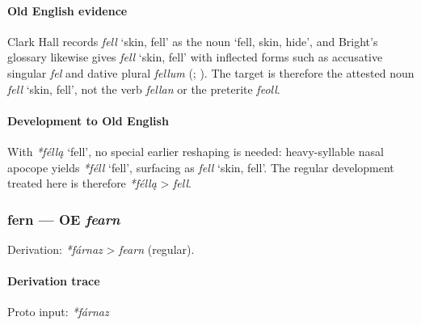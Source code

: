 \documentclass[
  british,
  a4paper,
]{article}
\providecommand{\Recon}[1]{\emph{*#1}}
\begin{document}
\paragraph{Old English evidence}\label{old-english-evidence-16}

Clark Hall records {\emph{fell}} `skin, fell' as the noun `fell, skin,
hide', and Bright's glossary likewise gives {\emph{fell}} `skin, fell'
with inflected forms such as accusative singular \emph{fel} and dative
plural \emph{fellum} (;
). The target is
therefore the attested noun {\emph{fell}} `skin, fell', not the verb
\emph{fellan} or the preterite \emph{feoll}.

\paragraph{Development to Old
English}\label{development-to-old-english-16}

With \Recon{féllą} `fell', no special earlier reshaping is needed:
heavy-syllable nasal apocope yields \Recon{féll} `fell', surfacing as
{\emph{fell}} `skin, fell'. The regular development treated here is
therefore \emph{*féllą} \textgreater{} \emph{fell}.

\subsubsection{\texorpdfstring{fern --- OE
\emph{fearn}}{fern --- OE fearn}}\label{fern-oe-fearn}

Derivation: \emph{*fárnaz} \textgreater{} \emph{fearn} (regular).

\paragraph{Derivation trace}\label{derivation-trace-18}

Proto input: \emph{*fárnaz}

\begingroup
\setlength{\fboxsep}{6pt}
\end{document}
